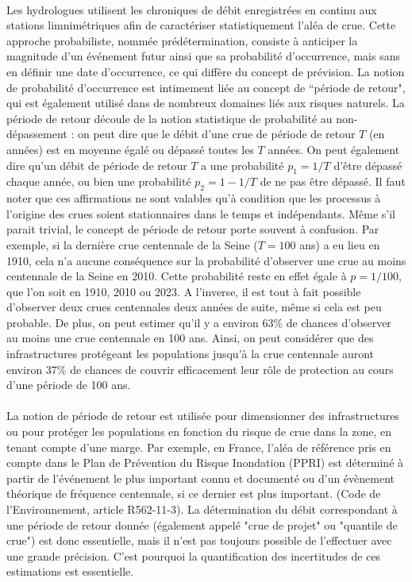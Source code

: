 \documentclass[11pt]{article}
\begin{document}
	\paragraph{} Les hydrologues utilisent les chroniques de débit enregistrées en continu aux stations limnimétriques afin de caractériser statistiquement l'aléa de crue. Cette approche probabiliste, nommée prédétermination, consiste à anticiper la magnitude d'un événement futur ainsi que sa probabilité d'occurrence, mais sans en définir une date d'occurrence, ce qui diffère du concept de prévision. La notion de probabilité d'occurrence est intimement liée au concept de ``période de retour", qui est également utilisé dans de nombreux domaines liés aux risques naturels. La période de retour découle de la notion statistique de probabilité au non-dépassement : on peut dire que le débit d'une crue de période de retour $T$ (en années) est en moyenne égalé ou dépassé toutes les $T$ années. On peut également dire qu'un débit de période de retour $T$ a une probabilité $p_1 = 1/T$ d'être dépassé chaque année, ou bien une probabilité $p_2 = 1-1/T$ de ne pas être dépassé. Il faut noter que ces affirmations ne sont valables qu'à condition que les processus à l'origine des crues soient stationnaires dans le temps et indépendants. Même s'il parait trivial, le concept de période de retour porte souvent à confusion. Par exemple, si la dernière crue centennale de la Seine ($T = 100$ ans) a eu lieu en 1910, cela n'a aucune conséquence sur la probabilité d'observer une crue au moins centennale de la Seine en 2010. Cette probabilité reste en effet égale à $p = 1/100$, que l'on soit en 1910, 2010 ou 2023. A l'inverse, il est tout à fait possible d'observer deux crues centennales deux années de suite, même si cela est peu probable. De plus, on peut estimer qu'il y a environ 63\% de chances d'observer au moins une crue centennale en 100 ans. Ainsi, on peut considérer que des infrastructures protégeant les populations jusqu'à la crue centennale auront environ 37\% de chances de couvrir efficacement leur rôle de protection au cours d'une période de 100 ans. 	
	
	\paragraph{} La notion de période de retour est utilisée pour dimensionner des infrastructures ou pour protéger les populations en fonction du risque de crue dans la zone, en tenant compte d'une marge. Par exemple, en France, l'aléa de référence pris en compte dans le Plan de Prévention du Risque Inondation (PPRI) \og est déterminé à partir de l'événement le plus important connu et documenté ou d'un évènement théorique de fréquence centennale, si ce dernier est plus important.\fg{} (Code de l'Environnement, article R562-11-3). La détermination du débit correspondant à une période de retour donnée (également appelé "crue de projet" ou "quantile de crue") est donc essentielle, mais il n'est pas toujours possible de l'effectuer avec une grande précision. C'est pourquoi la quantification des incertitudes de ces estimations est essentielle.
	
\end{document}
